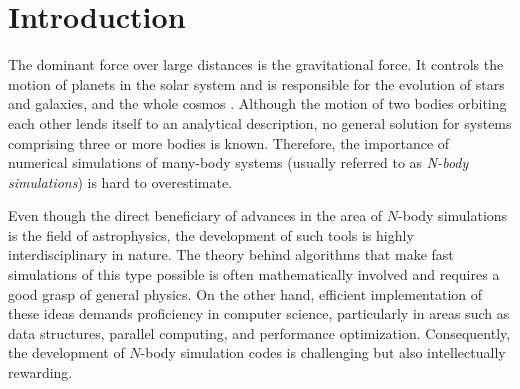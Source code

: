 \chapter{Introduction}
The dominant force over large distances is the gravitational force.
It controls the motion of planets in the solar system and is responsible for the evolution of stars and galaxies, and the whole cosmos \cite{nordtvedt2025gravity}.
Although the motion of two bodies orbiting each other lends itself to an analytical description, no general solution for systems comprising three or more bodies is known.
Therefore, the importance of numerical simulations of many-body systems (usually referred to as \textit{N-body simulations}) is hard to overestimate.

Even though the direct beneficiary of advances in the area of $N$-body simulations is the field of astrophysics, the development of such tools is highly interdisciplinary in nature.
The theory behind algorithms that make fast simulations of this type possible is often mathematically involved and requires a good grasp of general physics.
On the other hand, efficient implementation of these ideas demands proficiency in computer science, particularly in areas such as data structures, parallel computing, and performance optimization.
Consequently, the development of $N$-body simulation codes is challenging but also intellectually rewarding.




